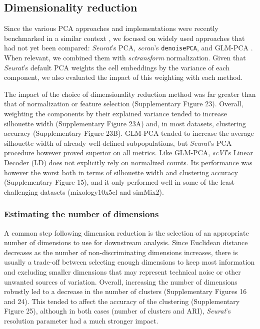 \documentclass{bmcart}
\begin{document}
\subsection*{Dimensionality reduction}

Since the various PCA approaches and implementations were recently benchmarked in a similar context \cite{TsuyuzakiPCA2020}, we focused on widely used approaches that had not yet been compared: \textit{Seurat}'s PCA, \textit{scran}'s \texttt{denoisePCA}, and GLM-PCA \cite{townesGlmpca2019}. When relevant, we combined them with \textit{sctransform} normalization. Given that \textit{Seurat}'s default PCA weights the cell embeddings by the variance of each component, we also evaluated the impact of this weighting with each method.

The impact of the choice of dimensionality reduction method was far greater than that of normalization or feature selection (Supplementary Figure 23). {\color{red}Overall, weighting the components by their explained variance tended to increase silhouette width (Supplementary Figure 23A) and, in most datasets, clustering accuracy (Supplementary} Figure 23B). GLM-PCA tended to increase the average silhouette width of already well-defined subpopulations, but \textit{Seurat}'s PCA procedure however proved superior on all metrics. Like GLM-PCA, \textit{scVI}'s Linear Decoder (LD) does not explicitly rely on normalized counts. {\color{red}Its performance was however the worst both in terms of silhouette width and clustering accuracy (Supplementary Figure 15), and it only performed well in some of the least challenging datasets (mixology10x5cl and simMix2).}

\subsubsection*{Estimating the number of dimensions}

A common step following dimension reduction is the selection of an appropriate number of dimensions to use for downstream analysis. Since Euclidean distance decreases as the number of non-discriminating dimensions increases, there is usually a trade-off between selecting enough dimensions to keep most information and excluding smaller dimensions that may represent technical noise or other unwanted sources of variation. Overall, increasing the number of dimensions robustly led to a decrease in the number of clusters (Supplementary Figures 16 and 24). This tended to affect the accuracy of the clustering (Supplementary Figure 25), although in both cases (number of clusters and ARI), \textit{Seurat}'s resolution parameter had a much stronger impact.
\end{document}
